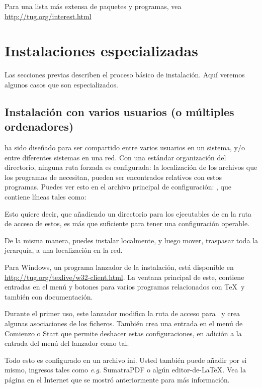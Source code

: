 \documentclass{article}
\begin{document}
Para una lista más extensa de paquetes y programas, vea
\url{http://tug.org/interest.html}

\section{Instalaciones especializadas}

Las secciones previas describen el proceso básico de instalación. Aquí
veremos algunos casos que son especializados. 

\subsection{Instalación con varios usuarios (o múltiples ordenadores)}
\label{sec:sharedinstall}

\TL{} ha sido diseñado para ser compartido entre varios
usuarios en un sistema, y/o entre diferentes sistemas en una
red. Con una estándar organización del directorio, ninguna
ruta forzada es configurada: la localización de los archivos
que los programas de \TL{} necesitan, pueden ser encontrados
relativos con estos programas. Puedes ver esto en el archivo
principal de configuración:
, que contiene líneas tales como:
Esto quiere decir, que añadiendo un directorio para los ejecutables de
\TL{} en la ruta de acceso de estos, es más que suficiente para
tener una configuración operable. 

De la misma manera, puedes instalar \TL{} localmente, y
luego mover, traspasar toda la jerarquía, a una localización
en la red. 

Para Windows, un programa lanzador  de la instalación, 
está disponible en
\url{http://tug.org/texlive/w32-client.html}. La ventana
principal de este, contiene entradas en el menú y botones para
varios programas relacionados con \TeX\ y también con
documentación. 

Durante el primer uso, este lanzador modifica la ruta de acceso para \TL\ y crea
algunas asociaciones de los ficheros. También crea una entrada
en el menú de Comienzo o Start que permite deshacer estas
configuraciones, en adición a la entrada del menú del lanzador como tal.

Todo esto es configurado en un archivo ini. Usted también puede añadir
por si mismo, ingresos tales como \emph{e.g.} SumatraPDF o
algún editor-de-\LaTeX. Vea la página en el Internet que se
mostró anteriormente para más información. 
\end{document}
